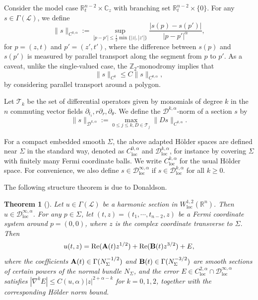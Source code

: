 \documentclass[11pt,a4paper]{article}
\numberwithin{equation}{section}%
\newtheorem{thm}{Theorem}[section]
\theoremstyle{definition}
\newcommand{\R}{\mathbb{R}}
\newcommand{\C}{\mathbb{C}}
\newcommand{\Z}{\mathbb{Z}}
\begin{document}
Consider the model case $\mathbb R^{n-2}_t\times \C_z$ with branching set $\R^{n-2}_t\times\{0\}$. For any $s\in \Gamma(\mathcal{L})$, we define
\[
    \|s\|_{C^{0,\alpha}}
    :=
    \sup_{|p-p'|\leqslant \frac{1}{2}\min\{|z|,|z'|\}}
    \frac{|s(p)-s(p')|}{|p-p'|^\alpha},
\]
for $p=(z,t)$ and $p'=(z',t')$, where the difference between $s(p)$ and $s(p')$ is measured by parallel transport along the segment from $p$ to $p'$. As a caveat, unlike the single-valued case, the $\Z_2$-monodromy implies that
$$\|s\|_{C^0}\leqslant C\|s\|_{C^{0,\alpha}},$$
by considering parallel transport around a polygon.

Let $\mathcal{T}_k$ be the set of differential operators given by monomials of degree $k$ in the $n$ commuting vector fields $\partial_{t_i},r\partial_r,\partial_\theta$.
We define the $\mathcal{D}^{k,\alpha}$-norm of a section $s$ by
\[
    \|s\|_{\mathcal{D}^{k,\alpha}}
    :=
    \max_{0\leqslant j\leqslant k,D\in \mathcal{T}_j}
    \|Ds\|_{C^{0,\alpha}}.
\]

For a compact embedded smooth $\Sigma$, the above adapted H\"older spaces are defined near $\Sigma$ in the standard way, denoted as $C^{0,\alpha}_{\operatorname{loc}}$ and $\mathcal{D}^{k,\alpha}_{\operatorname{loc}}$, for instance by covering $\Sigma$ with finitely many Fermi coordinate balls. We write $C^{k,\alpha}_{\operatorname{loc}}$ for the usual H\"older space. For convenience, we also define $s\in \mathcal{D}_{\operatorname{loc}}^{\infty,\alpha}$ if $s\in \mathcal{D}^{k,\alpha}_{\operatorname{loc}}$ for all $k\geqslant 0$. 

The following structure theorem is due to Donaldson.
\begin{thm}[\cite{Donaldson-Deformation}]\label{thm:structureofz2}
    Let $u\in \Gamma(\mathcal{L})$ be a harmonic section in $W^{1,2}_{\operatorname{loc}}(\R^n)$. Then $u\in \mathcal{D}^{\infty,\alpha}_{\operatorname{loc}}$. For any $p\in \Sigma$, let $(t,z)=(t_1,\cdots,t_{n-2},z)$ be a Fermi coordinate system around $p=(0,0)$, where $z$ is the complex coordinate transverse to $\Sigma$. Then
    \begin{equation}
        \label{eqn:asymptotestructuretheory}
        u(t,z)=\operatorname{Re}({\bf{A}}(t)z^{1/2})+\operatorname{Re}({\bf{B}}(t)z^{3/2})+E,
    \end{equation}
    where the coefficients ${\bf{A}}(t)\in \Gamma(N_{\Sigma}^{-1/2})$ and ${\bf{B}}(t)\in \Gamma(N_\Sigma^{-3/2})$ are smooth sections of certain powers of the normal bundle $N_\Sigma$, and the error $E\in C^{2,\alpha}_{\operatorname{loc}}\cap \mathcal{D}^{\infty,\alpha}_{\operatorname{loc}}$ satisfies $|\nabla^k E|\leqslant C(u,\alpha)|z|^{2+\alpha-k}$ for $k=0,1,2$, together with the corresponding H\"older norm bound. 
\end{thm}
\end{document}
